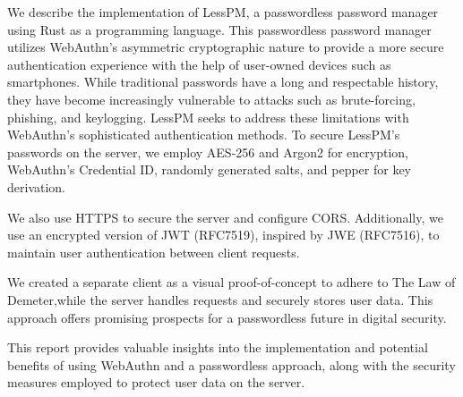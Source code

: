 We describe the implementation of LessPM, a passwordless password manager
using Rust as a programming language.
This passwordless password manager utilizes WebAuthn's asymmetric cryptographic
nature to provide a more secure authentication experience with the help of
user-owned devices such as smartphones.
While traditional passwords have a long and respectable history, they have
become increasingly vulnerable to attacks such as brute-forcing, phishing, and
keylogging.
LessPM seeks to address these limitations with WebAuthn's sophisticated
authentication methods.
To secure LessPM's passwords on the server, we employ AES-256 and Argon2 for
encryption, WebAuthn's Credential ID, randomly generated salts, and pepper for
key derivation.

We also use HTTPS to secure the server and configure CORS.
Additionally, we use an encrypted version of JWT (RFC7519), inspired by
JWE (RFC7516), to maintain user authentication between client requests.

We created a separate client as a visual
proof-of-concept to adhere to The Law of Demeter,while the server handles
requests and securely stores user data.
This approach offers promising prospects for a passwordless future in digital
security.

This report provides valuable insights into the implementation and potential
benefits of using WebAuthn and a passwordless approach, along with the security
measures employed to protect user data on the server.